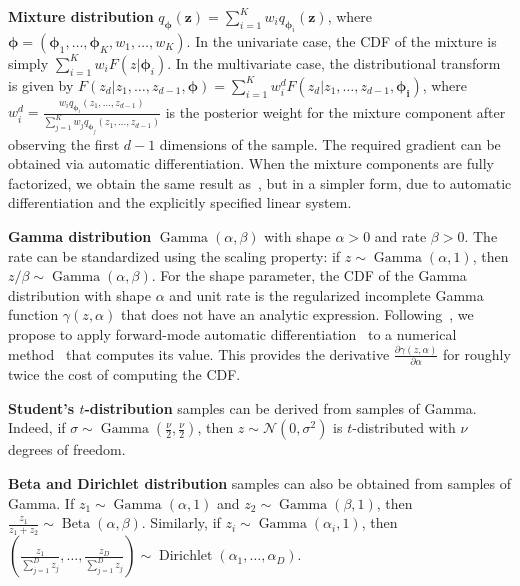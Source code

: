 \documentclass{article}
\let\vec\bm
\begin{document}
\textbf{Mixture distribution} $q_{\vec{\phi}} (\vec{z}) = \sum_{i=1}^K w_i q_{\vec{\phi}_i} (\vec{z})$, where $\vec{\phi} = (\vec{\phi}_1, \dots, \vec{\phi}_K, w_1, \dots, w_K)$.
In the univariate case, the CDF of the mixture is simply $\sum_{i=1}^K w_i F(z | \vec{\phi}_i)$.
In the multivariate case, the distributional transform is given by $F(z_d | z_1, \dots, z_{d-1}, \vec{\phi}) = \sum_{i=1}^K w^d_i F(z_d | z_1, \dots, z_{d-1}, \vec{\phi_i})$,
where $w^d_i = \frac{w_i q_{\vec{\phi}_i}(z_1, \dots, z_{d-1})}{\sum_{j=1}^K w_j q_{\vec{\phi}_j}(z_1, \dots, z_{d-1})}$ is the posterior weight for the mixture component after observing the first $d-1$ dimensions of the sample.
The required gradient can be obtained via automatic differentiation.
When the mixture components are fully factorized, we obtain the same result as~\cite{graves2016stochastic}, but in a simpler form, due to automatic differentiation and the explicitly specified linear system.

\textbf{Gamma distribution} $\operatorname{Gamma}(\alpha, \beta)$ with shape $\alpha > 0$ and rate $\beta > 0$.
The rate can be standardized using the scaling property: if $z \sim \operatorname{Gamma}(\alpha, 1)$, then $z/\beta \sim \operatorname{Gamma}(\alpha, \beta)$.
For the shape parameter, the CDF of the Gamma distribution with shape $\alpha$ and unit rate is the regularized incomplete Gamma function $\gamma(z, \alpha)$ that does not have an analytic expression.
Following~\citet{moore1982derincgamma}, we propose to apply forward-mode automatic differentiation~\cite{baydin2015automatic} to a numerical method~\cite{bhattacharjee1970incgamma} that computes its value.
This provides the derivative $\frac{\partial \gamma(z, \alpha)}{\partial \alpha}$ for roughly twice the cost of computing the CDF.

\textbf{Student's $t$-distribution} samples can be derived from samples of Gamma.
Indeed, if $\sigma \sim \operatorname{Gamma}(\frac{\nu}{2}, \frac{\nu}{2})$, then $z \sim \mathcal{N}(0, \sigma^2)$ is $t$-distributed with $\nu$ degrees of freedom.

\textbf{Beta and Dirichlet distribution} samples can also be obtained from samples of Gamma.
If $z_1 \sim \operatorname{Gamma}(\alpha, 1)$ and $z_2 \sim \operatorname{Gamma}(\beta, 1)$, then $\frac{z_1}{z_1 + z_2} \sim \operatorname{Beta}(\alpha, \beta)$.
Similarly, if $z_i \sim \operatorname{Gamma}(\alpha_i, 1)$, then $\left(\frac{z_1}{\sum_{j=1}^D z_j}, \dots, \frac{z_D}{\sum_{j=1}^D z_j}\right) \sim \operatorname{Dirichlet}(\alpha_1, \dots, \alpha_D)$.
\end{document}
